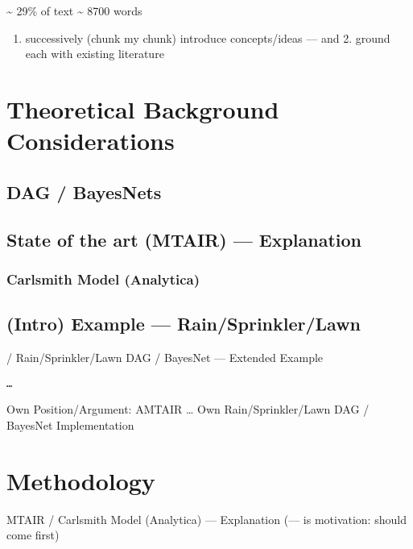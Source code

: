 \documentclass[12pt,a4paper]{report}      %
\providecommand{\tightlist}{%
  \setlength{\itemsep}{0pt}\setlength{\parskip}{0pt}}
\begin{document}
\textasciitilde{} 29\% of text \textasciitilde{} 8700 words

\begin{enumerate}
\def\labelenumi{\arabic{enumi}.}
\tightlist
\item
  successively (chunk my chunk) introduce concepts/ideas --- and 2.
  ground each with existing literature
\end{enumerate}

\section{Theoretical Background
Considerations}\label{theoretical-background-considerations}

\subsection{DAG / BayesNets}\label{dag-bayesnets}

\subsection{State of the art (MTAIR) ---
Explanation}\label{state-of-the-art-mtair-explanation}

\subsubsection{Carlsmith Model
(Analytica)}\label{carlsmith-model-analytica}

\subsection{(Intro) Example ---
Rain/Sprinkler/Lawn}\label{intro-example-rainsprinklerlawn}

/ Rain/Sprinkler/Lawn DAG / BayesNet --- Extended Example

\begin{verbatim}
…
\end{verbatim}

Own Position/Argument: AMTAIR \ldots{} Own Rain/Sprinkler/Lawn DAG /
BayesNet Implementation

\section{Methodology}\label{methodology}

MTAIR / Carlsmith Model (Analytica) --- Explanation (--- is motivation:
should come first)
\end{document}
